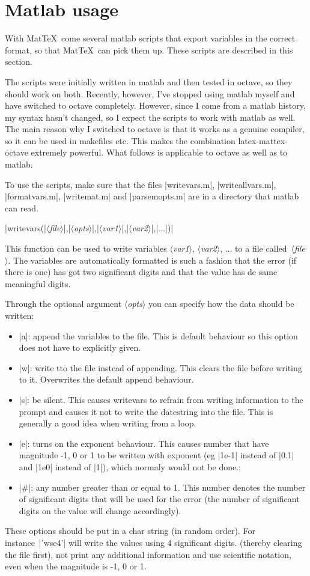 \documentclass[a4paper,10pt]{article}
\makeatletter
\newcommand{\mt}{Mat\TeX\ }
\newcommand\argu[1]{{\color{black}$\langle$\textit{#1}$\rangle$}}
\newcommand\co[0]{\color{violet}}
\newcommand\mtmrg[1]{\marginpar{\texttt{#1}}}
\newcommand\mmrg[1]{\index{#1@\texttt{#1}}\mtmrg{#1}}
\makeatother
\begin{document}
\section{Matlab usage}
With \mt come several matlab scripts that export variables in the correct format, so that \mt can pick them up. These scripts are described in this section. 

The scripts were initially written in matlab and then tested in octave, so they should work on both. Recently, however, I've stopped using matlab myself and have switched to octave completely. However, since I come from a matlab history, my syntax hasn't changed, so I expect the scripts to work with matlab as well. The main reason why I switched to octave is that it works as a genuine compiler, so it can be used in makefiles etc. This makes the combination latex-mattex-octave extremely powerful. What follows is applicable to octave as well as to matlab.

To use the scripts, make sure that the files |writevars.m|, |writeallvars.m|,\\ |formatvars.m|, |writemat.m| and |parsemopts.m| are in a directory that matlab can read.

\bigskip
{\co |writevars(|\argu{file}|,|\argu{opts}|,|\argu{var1}|,|\argu{var2}|,|$\ldots$|)|}

\mmrg{writevars}
This function can be used to write variables \argu{var1}, \argu{var2}, $\ldots$ to a file called~\argu{file}. The variables are automatically formatted is such a fashion that the error (if there is one) has got two significant digits and that the value has de same meaningful digits.

Through the optional argument \argu{opts} you can specify how the data should be written:
\begin{itemize}
	\item |a|: append the variables to the file. This is default behaviour so this option does not have to explicitly given.
	\item |w|: write tto the file instead of appending. This clears the file before writing to it. Overwrites the default append behaviour.
	\item |s|: be silent. This causes writevars to refrain from writing information to the prompt and causes it not to write the datestring into the file. This is generally a good idea when writing from a loop.
	\item |e|: turns on the exponent behaviour. This causes number that have magnitude -1, 0 or 1 to be written with exponent (eg |1e-1| instead of |0.1| and |1e0| instead of |1|), which normaly would not be done.;
	\item |#|: any number greater than or equal to 1. This number denotes the number of significant digits that will be used for the error (the number of significant digits on the value will change accordingly).
\end{itemize}
These options should be put in a char string (in random order). For instance~|'wse4'| will write the values using 4 significant digits. (thereby clearing the file first), not print any additional information and use scientific notation, even when the magnitude is -1, 0 or 1.
\end{document}
